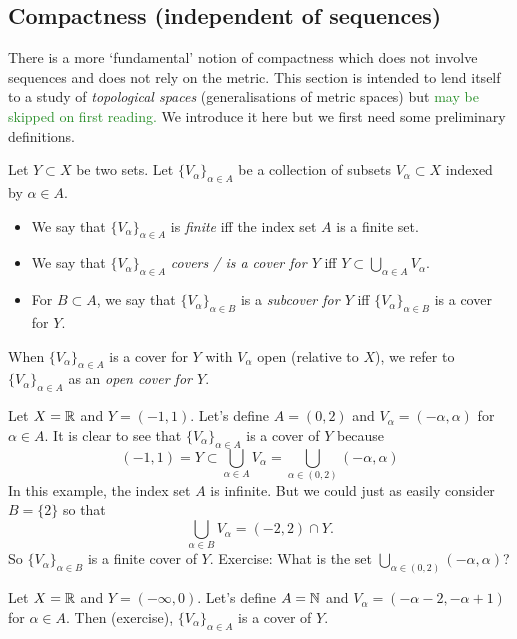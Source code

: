 \subsection{Compactness (independent of sequences)}
There is a more `fundamental' notion of compactness which does not involve sequences and does not rely on the metric. This section is intended to lend itself to a study of \textit{topological spaces} (generalisations of metric spaces) but \textcolor{ForestGreen}{may be skipped on first reading.} We introduce it here but we first need some preliminary definitions.
\begin{defn}[Covers]
Let $Y\subset X$ be two sets. Let $\{V_\alpha\}_{\alpha \in A}$ be a collection of subsets $V_\alpha \subset X$ indexed by $\alpha \in A$.
\begin{itemize}
	\item We say that $\{V_\alpha\}_{\alpha\in A}$ is \textit{finite} iff the index set $A$ is a finite set.
	\item We say that $\{V_\alpha\}_{\alpha \in A}$ \textit{covers / is a cover for $Y$} iff $Y \subset \bigcup_{\alpha \in A}V_\alpha.$
	\item For $B\subset A$, we say that $\{V_\alpha\}_{\alpha \in B}$ is a \textit{subcover for $Y$} iff $\{V_\alpha\}_{\alpha \in B}$ is a cover for $Y$.
\end{itemize}
When $\{V_\alpha\}_{\alpha \in A}$ is a cover for $Y$ with $V_\alpha$ open (relative to $X$), we refer to $\{V_\alpha\}_{\alpha \in A}$ as an \textit{open cover for $Y$}.
\end{defn}
\begin{eg}
Let $X = \mathbb{R}$ and $Y = (-1,1)$. Let's define $A = (0,2)$ and $V_\alpha = (-\alpha,\alpha)$ for $\alpha \in A$. It is clear to see that $\{V_\alpha\}_{\alpha \in A}$ is a cover of $Y$ because
\[
(-1,1) = Y \subset \bigcup_{\alpha \in A} V_\alpha = \bigcup_{\alpha \in (0,2)}(-\alpha,\alpha)
\]
In this example, the index set $A$ is infinite. But we could just as easily consider $B = \{2\}$ so that
\[
\bigcup_{\alpha \in B}V_\alpha = (-2,2) \cap Y.
\]
So $\{V_\alpha\}_{\alpha \in B}$ is a finite cover of $Y$.
Exercise: What is the set $\bigcup_{\alpha \in (0,2)}(-\alpha,\alpha)$?
\end{eg}
\begin{eg}
Let $X = \mathbb{R}$ and $Y = (-\infty, 0)$. Let's define $A = \mathbb{N}$ and $V_\alpha = (-\alpha - 2, -\alpha+1)$ for $\alpha \in A$. Then (exercise), $\{V_\alpha\}_{\alpha \in A}$ is a cover of $Y$.
\end{eg}
